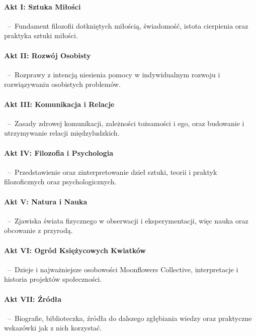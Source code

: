 \paragraph*{Akt I: Sztuka Miłości}\, --\, Fundament filozofii dotkniętych miłością, świadomość, istota cierpienia oraz praktyka sztuki miłości.

\paragraph*{Akt II: Rozwój Osobisty}\, --\, Rozprawy z intencją niesienia pomocy w indywidualnym rozwoju i rozwiązywaniu osobistych problemów.

\paragraph*{Akt III: Komunikacja i Relacje}\, --\, Zasady zdrowej komunikacji, zależności tożsamości i ego, oraz budowanie i utrzymywanie relacji międzyludzkich.

\paragraph*{Akt IV: Filozofia i Psychologia}\, --\, Przedstawienie oraz zinterpretowanie dzieł sztuki, teorii i praktyk filozoficznych oraz psychologicznych.

\paragraph*{Akt V: Natura i Nauka}\, --\, Zjawiska świata fizycznego w obserwacji i eksperymentacji, więc nauka oraz obcowanie z przyrodą.

\paragraph*{Akt VI: Ogród Księżycowych Kwiatków}\, --\, Dzieje i najważniejsze osobowości Moonflowers Collective, interpretacje i historia projektów społeczności.

\paragraph*{Akt VII: Źródła}\, --\, Biografie, biblioteczka, źródła do dalszego zgłębiania wiedzy oraz praktyczne wskazówki jak z nich korzystać.

